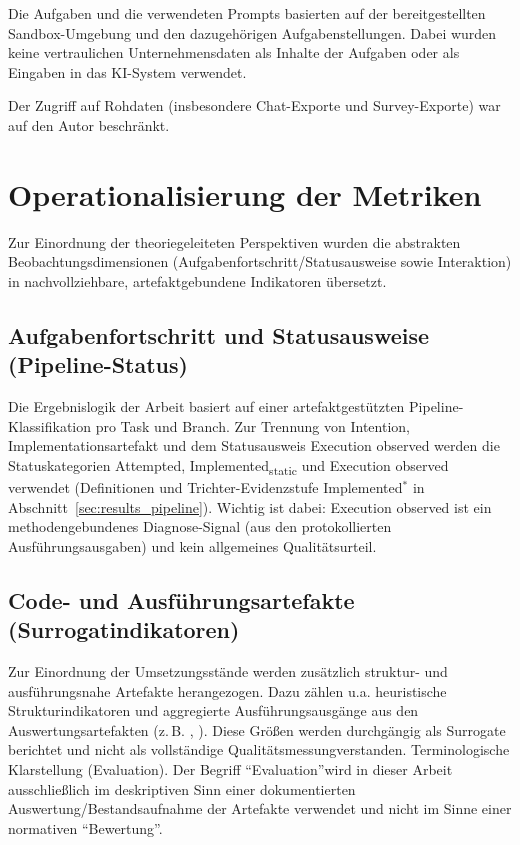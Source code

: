 Die Aufgaben und die verwendeten Prompts basierten auf der bereitgestellten Sandbox-Umgebung und den dazugehörigen Aufgabenstellungen. Dabei wurden keine vertraulichen Unternehmensdaten als Inhalte der Aufgaben oder als Eingaben in das KI-System verwendet.

Der Zugriff auf Rohdaten (insbesondere Chat-Exporte und Survey-Exporte) war auf den Autor beschränkt.

\section{Operationalisierung der Metriken}
Zur Einordnung der theoriegeleiteten Perspektiven wurden die abstrakten Beobachtungsdimensionen (Aufgabenfortschritt/Statusausweise sowie Interaktion) in nachvollziehbare, artefaktgebundene Indikatoren übersetzt.

\subsection{Aufgabenfortschritt und Statusausweise (Pipeline-Status)}
Die Ergebnislogik der Arbeit basiert auf einer artefaktgestützten Pipeline-Klassifikation pro Task und Branch. Zur Trennung von Intention, Implementationsartefakt und dem Statusausweis Execution observed werden die Statuskategorien Attempted, Implemented\textsubscript{static} und Execution observed verwendet (Definitionen und Trichter-Evidenzstufe Implemented$^\ast$ in Abschnitt~\ref{sec:results_pipeline}). Wichtig ist dabei: Execution observed ist ein methodengebundenes Diagnose-Signal (aus den protokollierten Ausführungsausgaben) und kein allgemeines Qualitätsurteil.

\subsection{Code- und Ausführungsartefakte (Surrogatindikatoren)}
Zur Einordnung der Umsetzungsstände werden zusätzlich struktur- und ausführungsnahe Artefakte herangezogen. Dazu zählen u.a. heuristische Strukturindikatoren und aggregierte Ausführungsausgänge aus den Auswertungsartefakten (z.\,B. , ). Diese Größen werden durchgängig als Surrogate berichtet und nicht als vollständige Qualitätsmessung\linebreak verstanden. Terminologische Klarstellung (Evaluation). Der Begriff \enquote{Evaluation}\linebreak wird in dieser Arbeit ausschließlich im deskriptiven Sinn einer dokumentierten Auswertung/Bestandsaufnahme der Artefakte verwendet und nicht im Sinne einer normativen \enquote{Bewertung}.

